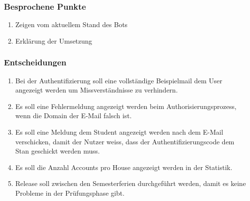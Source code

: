 \documentclass[a4paper, table]{article}
\begin{document}
\subsubsection*{Besprochene Punkte}

\begin{enumerate}
    \item Zeigen vom aktuellem Stand des Bots
    \item Erklärung der Umsetzung
\end{enumerate}

\subsubsection*{Entscheidungen}

\begin{enumerate}
    \item Bei der Authentifizierung soll eine vollständige Beispielmail dem User angezeigt werden um Missverständnisse zu verhindern.
    \item Es soll eine Fehlermeldung angezeigt werden beim Authorisierungsprozess, wenn die Domain der E-Mail falsch ist.
    \item Es soll eine Meldung dem Student angezeigt werden nach dem E-Mail verschicken, damit der Nutzer weiss, dass der Authentifizierungscode dem Stan geschickt werden muss.
    \item Es soll die Anzahl Accounts pro House angezeigt werden in der Statistik.
    \item Release soll zwischen den Semesterferien durchgeführt werden, damit es keine Probleme in der Prüfungsphase gibt.
\end{enumerate}
\end{document}
